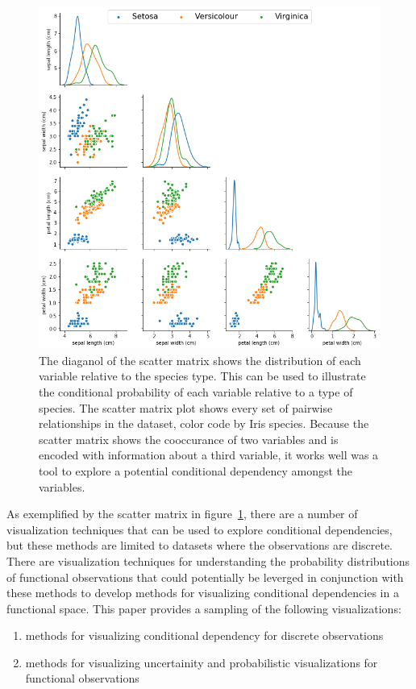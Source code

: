 \documentclass[letterpaper,onecolumn,titlepage]{Ythesis}
\begin{document}
\begin{figure}
\includegraphics[width=\textwidth]{intro/iris_observations.png}
\caption{The diaganol of the scatter matrix shows the distribution of each variable relative to the species type. This can be used to illustrate the conditional probability of each variable relative to a type of species. The scatter matrix plot shows every set of pairwise relationships in the dataset, color code by Iris species. Because the scatter matrix shows the cooccurance of two variables and is encoded with information about a third variable, it works well was a tool to explore a potential conditional dependency amongst the variables.}
\label{fig:iris_observations}
\end{figure}

As exemplified by the scatter matrix in figure~\ref{fig:iris_observations}, there are a number of visualization techniques that can be used to explore conditional dependencies, but these methods are limited to datasets where the observations are discrete. There are visualization techniques for understanding the probability distributions of functional observations that could potentially be leverged in conjunction with these methods to develop methods for visualizing conditional dependencies in a functional space. This paper provides a sampling of the following visualizations:
\begin{enumerate}
\item methods for visualizing conditional dependency for discrete observations
\item methods for visualizing uncertainity and probabilistic visualizations for functional observations
\end{enumerate}
\end{document}
